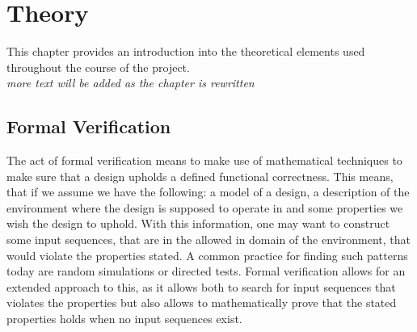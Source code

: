 \chapter{Theory}


This chapter provides an introduction into the theoretical elements used throughout the course of the project. \\ \textit{more text will be added as the chapter is rewritten}




\section{Formal Verification}

The act of formal verification means to make use of mathematical techniques to make sure that a design upholds a defined functional correctness\cite{bjesse2005formal}.
This means, that if we assume we have the following: a model of a design, a description of the environment where the design is supposed to operate in and some properties we wish the design to uphold. With this information, one may want to construct some input sequences, that are in the allowed in domain of the environment, that would violate the properties stated. A common practice for finding such patterns today are random simulations or directed tests.
Formal verification allows for an extended approach to this, as it allows both to search for input sequences that violates the properties but also allows to mathematically prove that the stated properties holds when no input sequences exist.

